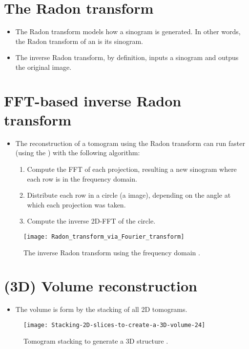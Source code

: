\section{The Radon transform}
\begin{itemize}
\item The Radon transform models how a sinogram is generated. In other
  words, the Radon transform of an  is
  its sinogram.
\item The inverse Radon transform, by definition, inputs a sinogram
  and outpus the original image.
\end{itemize}

\section{FFT-based inverse Radon transform}
\begin{itemize}
\item The reconstruction of a tomogram using the Radon transform can
  run faster (using the ) with the following algorithm:
  \begin{enumerate}
  \item Compute the FFT of each projection, resulting a new sinogram
    where each row is in the frequency domain.
  \item Distribute each row in a circle (a image), depending on the
    angle at which each projection was taken.
  \item Compute the inverse 2D-FFT of the circle.
  \end{enumerate}
\end{itemize}
\vspace{-4ex}
\begin{figure}[!b]
  \centering
  \texttt{[image: Radon\_transform\_via\_Fourier\_transform]}
  \caption{The inverse Radon transform using the frequency domain
    \cite{wikipedia2025radom_transform}.\label{fig:inverse_Radon}}
\end{figure}

\section{(3D) Volume reconstruction}
\begin{itemize}
\item The volume is form by the stacking of all 2D tomograms.
\end{itemize}
\vspace{-4ex}
\begin{figure}[!b]
  \centering
  \texttt{[image: Stacking-2D-slices-to-create-a-3D-volume-24]}
  \caption{Tomogram stacking to generate a 3D structure
    \cite{alzu2019multi}.\label{fig:stacking}}
\end{figure}

